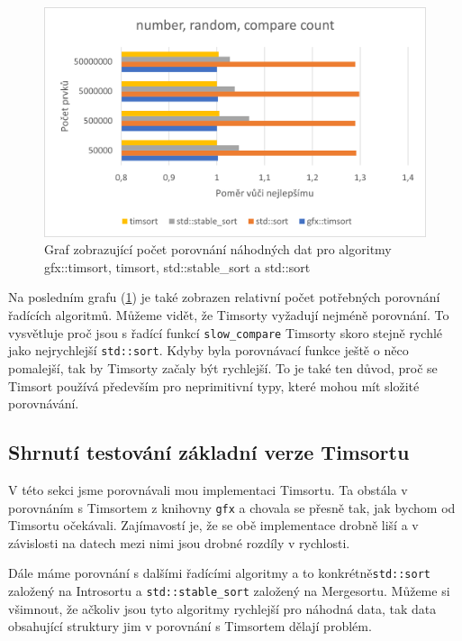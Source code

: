 \documentclass[thesis=B,czech]{FITthesis}[2019/12/23]
\begin{document}
\begin{figure}[htbp]\centering
	\includegraphics{obrazky/graf13.png}
	\caption[Graf zobrazující počet porovnání náhodných dat pro algoritmy gfx::timsort, timsort, std::stable\_sort a std::sort]{Graf zobrazující počet porovnání náhodných dat pro algoritmy gfx::timsort, timsort, std::stable\_sort a std::sort}\label{fig:graf13}
\end{figure}


Na posledním grafu (\ref{fig:graf13}) je také zobrazen relativní počet potřebných porovnání řadících algoritmů. Můžeme vidět, že Timsorty vyžadují nejméně porovnání. To vysvětluje proč jsou s řadící funkcí \texttt{slow\_compare} Timsorty skoro stejně rychlé jako nejrychlejší \texttt{std::sort}. Kdyby byla porovnávací funkce ještě o něco pomalejší, tak by Timsorty začaly být rychlejší. To je také ten důvod, proč se Timsort používá především pro neprimitivní typy, které mohou mít složité porovnávání.

\FloatBarrier


\subsection{Shrnutí testování základní verze Timsortu}

V této sekci jsme porovnávali mou implementaci Timsortu. Ta obstála v porovnáním s Timsortem z knihovny \texttt{gfx} a chovala se přesně tak, jak bychom od Timsortu očekávali. Zajímavostí je, že se obě implementace drobně liší a v závislosti na datech mezi nimi jsou drobné rozdíly v rychlosti. 

Dále máme porovnání s dalšími řadícími algoritmy a to konkrétně\linebreak \texttt{std::sort} založený na Introsortu a \texttt{std::stable\_sort} založený na Mergesortu. Můžeme si všimnout, že ačkoliv jsou tyto algoritmy rychlejší pro náhodná data, tak data obsahující struktury jim v porovnání s Timsortem dělají problém.
\end{document}
